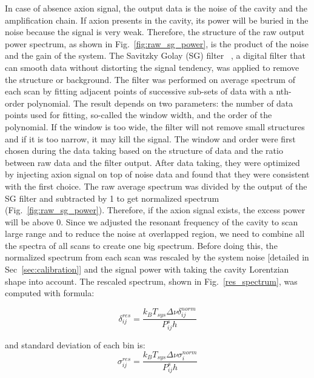 In case of absence axion signal, the output data is the noise of the cavity and the amplification chain. If axion presents in the cavity, its power will be buried in the noise because the signal is very weak. Therefore, the structure of the raw output power spectrum, as shown in Fig.~\ref{fig:raw_sg_power}, is the product of the noise and the gain of the system. The Savitzky Golay (SG) filter ~\cite{SGFilter}, a digital filter that can smooth data without distorting the signal tendency, was applied to remove the structure or background.
The filter was performed on average spectrum of each scan by fitting adjacent points of successive sub-sets of data with a nth-order polynomial. The result depends on two parameters: the number of data points used for fitting, so-called the window width, and the order of the polynomial. If the window is too wide, the filter will not remove small structures and if it is too narrow, it may kill the signal. The window and order were first chosen during the data taking based on the structure of data and the ratio between raw data and the filter output. After data taking, they were optimized by injecting axion signal on top of noise data and found that they were consistent with the first choice.
The raw average spectrum was divided by the output of the SG filter and subtracted by 1 to get normalized spectrum (Fig.~\ref{fig:raw_sg_power}).
Therefore, if the axion signal exists, the excess power will be above 0.
Since we adjusted the resonant frequency of the cavity to scan large range and to reduce the noise at overlapped region, we need to combine all the spectra of all scans to create one big spectrum. Before doing this, the normalized spectrum from each scan was rescaled by the system noise [detailed in Sec~\ref{sec:calibration}] and the signal power with taking the cavity Lorentzian shape into account. The rescaled spectrum, shown in Fig.~\ref{res_spectrum}, was computed with formula:

\begin{equation}
  \label{eq:respower_eqn}
  \delta_{ij}^{res} = \frac{k_{B}T_{sys}\Delta\nu \delta_{ij}^{norm}}{P_{ij}^{s} h}
\end{equation}

and standard deviation of each bin is:
\begin{equation}
  \label{eq:ressigma_eqn}
  \sigma_{ij}^{res} = \frac{k_{B}T_{sys}\Delta\nu \sigma_{i}^{norm}}{P_{ij}^{s} h}
\end{equation}


